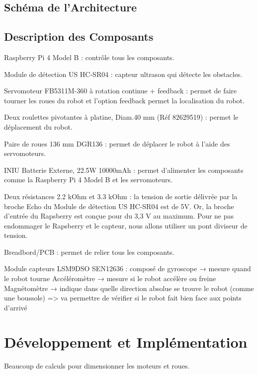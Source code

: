 \documentclass[a4paper,12pt]{report}  %
\begin{document}
	\subsection{Schéma de l'Architecture}
	
	\subsection{Description des Composants}
	Raspberry Pi 4 Model B : contrôle tous les composants.

	Module de détection US HC-SR04 : capteur ultrason qui détecte les obstacles.

	Servomoteur FB5311M-360 à rotation continue + feedback : permet de faire tourner les 
	roues du robot et l'option feedback permet la localisation du robot.

	Deux roulettes pivotantes à platine, Diam.40 mm (Réf 82629519) : permet le déplacement 
	du robot.

	Paire de roues 136 mm DGR136 : permet de déplacer le robot à l'aide des servomoteurs.

	INIU Batterie Externe, 22.5W 10000mAh : permet d'alimenter les composants comme la 
	Raspberry Pi 4 Model B et les servomoteurs.

	Deux résistances 2.2 kOhm et 3.3 kOhm : la tension de sortie délivrée par la 
	broche Echo du Module de détection US HC-SR04 est de 5V. Or, la broche d'entrée 
	du Rapsberry est conçue pour du 3,3 V au maximum. Pour ne pas endommager le 
	Rapsberry et le capteur, nous allons utiliser un pont diviseur de tension.

	Breadbord/PCB : permet de relier tous les composants.

	Module capteurs LSM9DSO SEN12636 : composé de gyroscope → mesure quand le robot tourne
	Accéléromètre → mesure si le robot accélère ou freine
	Magnétomètre → indique dans quelle direction absolue se trouve le robot (comme une 
	boussole) 
	=> va permettre de vérifier si le robot fait bien face aux points d’arrivé
	
	\section{Développement et Implémentation}

	Beaucoup de calculs pour dimensionner les moteurs et roues.
\end{document}
